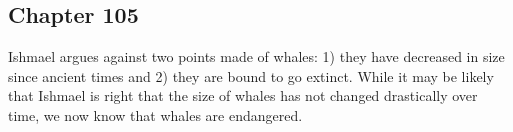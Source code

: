 \subsection{Chapter 105}

Ishmael argues against two points made of whales: 1) they have decreased in
size since ancient times and 2) they are bound to go extinct. While it may be
likely that Ishmael is right that the size of whales has not changed
drastically over time, we now know that whales are endangered.
